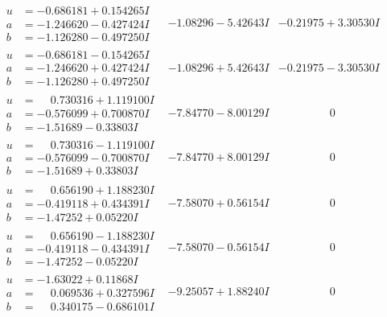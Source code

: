 \documentclass[1p]{elsarticle_modified}
\theoremstyle{definition}
\begin{document}
$$\begin{array}{c|c|c}
\begin{aligned}
u &= -0.686181 + 0.154265 I \\
a &= -1.246620 - 0.427424 I \\
b &= -1.126280 - 0.497250 I\end{aligned}
 & -1.08296 - 5.42643 I & -0.21975 + 3.30530 I \\ \hline\begin{aligned}
u &= -0.686181 - 0.154265 I \\
a &= -1.246620 + 0.427424 I \\
b &= -1.126280 + 0.497250 I\end{aligned}
 & -1.08296 + 5.42643 I & -0.21975 - 3.30530 I \\ \hline\begin{aligned}
u &= \phantom{-}0.730316 + 1.119100 I \\
a &= -0.576099 + 0.700870 I \\
b &= -1.51689 - 0.33803 I\end{aligned}
 & -7.84770 - 8.00129 I & \phantom{-0.000000 } 0 \\ \hline\begin{aligned}
u &= \phantom{-}0.730316 - 1.119100 I \\
a &= -0.576099 - 0.700870 I \\
b &= -1.51689 + 0.33803 I\end{aligned}
 & -7.84770 + 8.00129 I & \phantom{-0.000000 } 0 \\ \hline\begin{aligned}
u &= \phantom{-}0.656190 + 1.188230 I \\
a &= -0.419118 + 0.434391 I \\
b &= -1.47252 + 0.05220 I\end{aligned}
 & -7.58070 + 0.56154 I & \phantom{-0.000000 } 0 \\ \hline\begin{aligned}
u &= \phantom{-}0.656190 - 1.188230 I \\
a &= -0.419118 - 0.434391 I \\
b &= -1.47252 - 0.05220 I\end{aligned}
 & -7.58070 - 0.56154 I & \phantom{-0.000000 } 0 \\ \hline\begin{aligned}
u &= -1.63022 + 0.11868 I \\
a &= \phantom{-}0.069536 + 0.327596 I \\
b &= \phantom{-}0.340175 - 0.686101 I\end{aligned}
 & -9.25057 + 1.88240 I & \phantom{-0.000000 } 0 \\ \hline\begin{aligned}

\end{aligned}
\end{array}$$
\end{document}
